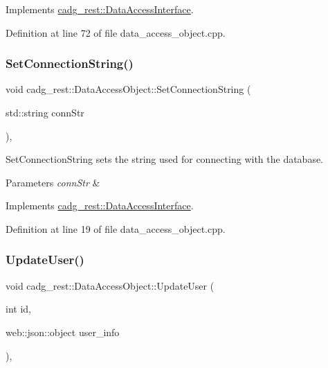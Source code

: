Implements \mbox{\hyperlink{classcadg__rest_1_1_data_access_interface_a1f3c5c41611ae04a32935df01505c98d}{cadg\+\_\+rest\+::\+Data\+Access\+Interface}}.



Definition at line 72 of file data\+\_\+access\+\_\+object.\+cpp.

\mbox{\label{classcadg__rest_1_1_data_access_object_a9f5981fb13220932808b46fee7b55398}} 
\subsubsection{\texorpdfstring{SetConnectionString()}{SetConnectionString()}}
{\footnotesize\ttfamily void cadg\+\_\+rest\+::\+Data\+Access\+Object\+::\+Set\+Connection\+String (\begin{DoxyParamCaption}\item[{std\+::string}]{conn\+Str }\end{DoxyParamCaption})\hspace{0.3cm}{\ttfamily [override]}, {\ttfamily [virtual]}}

Set\+Connection\+String sets the string used for connecting with the database. 
\begin{DoxyParams}{Parameters}
{\em conn\+Str} & \\
\hline
\end{DoxyParams}


Implements \mbox{\hyperlink{classcadg__rest_1_1_data_access_interface_a919c1024501d1ba5eec4ff6dfce7c742}{cadg\+\_\+rest\+::\+Data\+Access\+Interface}}.



Definition at line 19 of file data\+\_\+access\+\_\+object.\+cpp.

\mbox{\label{classcadg__rest_1_1_data_access_object_af9a88b06de9cd2c7042c91be83e00872}} 
\subsubsection{\texorpdfstring{UpdateUser()}{UpdateUser()}}
{\footnotesize\ttfamily void cadg\+\_\+rest\+::\+Data\+Access\+Object\+::\+Update\+User (\begin{DoxyParamCaption}\item[{int}]{id,  }\item[{web\+::json\+::object}]{user\+\_\+info }\end{DoxyParamCaption})\hspace{0.3cm}{\ttfamily [override]}, {\ttfamily [virtual]}}



